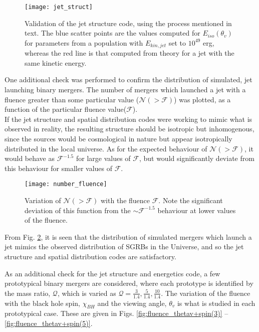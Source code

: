     \begin{figure}[H]
        \centering
        \texttt{[image: jet\_struct]}
        \caption[Validation of the jet structure code]
        {
            Validation of the jet structure code, using the process mentioned in text.
            The blue scatter points are the values computed for $E_{iso}(\theta_v)$ for
            parameters from a population with $E_{kin, jet}$ set to $10^{49}$ erg,
            whereas the red line is that computed from theory for a jet with the same
            kinetic energy.
        }
        \label{fig:jet_struct}
    \end{figure}

    One additional check was performed to confirm the distribution of simulated, jet
    launching binary mergers. The number of mergers which launched a jet with a fluence
    greater than some particular value ($\mathcal{N}(>\mathcal{F})$) was plotted, as a
    function of the particular fluence value($\mathcal{F}$).\\
    If the jet structure and spatial distribution codes were working to mimic what is
    observed in reality, the resulting structure should be isotropic but inhomogenous,
    since the sources would be cosmological in nature but appear isotropically
    distributed in the local universe. As for the expected behaviour of $\mathcal{N}(>
    \mathcal{F})$, it would behave as $\mathcal{F}^{-1.5}$ for large values of
    $\mathcal{F}$, but would significantly deviate from this behaviour
    for smaller values of $\mathcal{F}$.

    \begin{figure}[H]
        \centering
        \texttt{[image: number\_fluence]}
        \caption[Variation of $\mathcal{N}(> \mathcal{F})$ with $\mathcal{F}$]{
            Variation of $\mathcal{N}(> \mathcal{F})$ with the fluence $\mathcal{F}$.
            Note the significant deviation of this function from the $\sim
            \mathcal{F}^{-1.5}$ behaviour at lower values of the fluence.
        }
        \label{fig:number_fluence}
    \end{figure}

    From Fig. \ref{fig:number_fluence}, it is seen that the distribution of simulated
    mergers which launch a jet mimics the observed distribution of SGRBs in the
    Universe, and so the jet structure and spatial distribution codes are satisfactory.

    As an additional check for the jet structure and energetics code, a few prototypical
    binary mergers are considered, where each prototype is identified by the mass ratio,
    $\mathcal{Q}$, which is varied as $\mathcal{Q} = \frac{3}{1.4}, \frac{5}{1.4},
    \frac{10}{1.4}$. The variation of the fluence with the black hole spin, $\chi_{BH}$
    and the viewing angle, $\theta_v$ is what is studied in each prototypical case.
    These are given in Figs. \ref{fig:fluence_thetav+spin(3)} --
    \ref{fig:fluence_thetav+spin(5)}.

